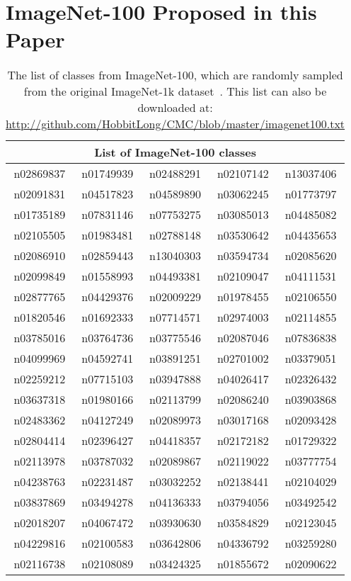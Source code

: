 \documentclass[10pt,twocolumn,letterpaper]{article}
\newcommand{\changeurlcolor}[1]{\hypersetup{urlcolor=#1}}
\begin{document}
{\small


}

\newpage

\appendix
\section{ImageNet-100 Proposed in this Paper}
\changeurlcolor{purple}
\begin{table}[t]
\caption{\small{The list of classes from ImageNet-100, which are randomly sampled from the original ImageNet-1k dataset~\cite{deng2009imagenet}. This list can also be downloaded at:
\small{\url{http://github.com/HobbitLong/CMC/blob/master/imagenet100.txt}}}
}
\setlength{\tabcolsep}{3.5pt}
\small
\vspace{-10pt}
\label{tab:imagenet100_list}
\begin{center}
\begin{small}
\begin{tabular}{ccccc}
\toprule
\multicolumn{5}{c}{List of ImageNet-100 classes} \\
\midrule
\midrule

n02869837 & n01749939 & n02488291 & n02107142 & n13037406  \\
n02091831 & n04517823 & n04589890 & n03062245 & n01773797  \\
n01735189 & n07831146 & n07753275 & n03085013 & n04485082  \\
n02105505 & n01983481 & n02788148 & n03530642 & n04435653  \\
n02086910 & n02859443 & n13040303 & n03594734 & n02085620  \\
n02099849 & n01558993 & n04493381 & n02109047 & n04111531  \\
n02877765 & n04429376 & n02009229 & n01978455 & n02106550  \\
n01820546 & n01692333 & n07714571 & n02974003 & n02114855  \\
n03785016 & n03764736 & n03775546 & n02087046 & n07836838  \\
n04099969 & n04592741 & n03891251 & n02701002 & n03379051  \\
n02259212 & n07715103 & n03947888 & n04026417 & n02326432  \\
n03637318 & n01980166 & n02113799 & n02086240 & n03903868  \\
n02483362 & n04127249 & n02089973 & n03017168 & n02093428  \\
n02804414 & n02396427 & n04418357 & n02172182 & n01729322  \\
n02113978 & n03787032 & n02089867 & n02119022 & n03777754  \\
n04238763 & n02231487 & n03032252 & n02138441 & n02104029  \\
n03837869 & n03494278 & n04136333 & n03794056 & n03492542  \\
n02018207 & n04067472 & n03930630 & n03584829 & n02123045  \\
n04229816 & n02100583 & n03642806 & n04336792 & n03259280  \\
n02116738 & n02108089 & n03424325 & n01855672 & n02090622  \\


\end{tabular}
\end{small}
\end{center}
\end{table}
\end{document}
